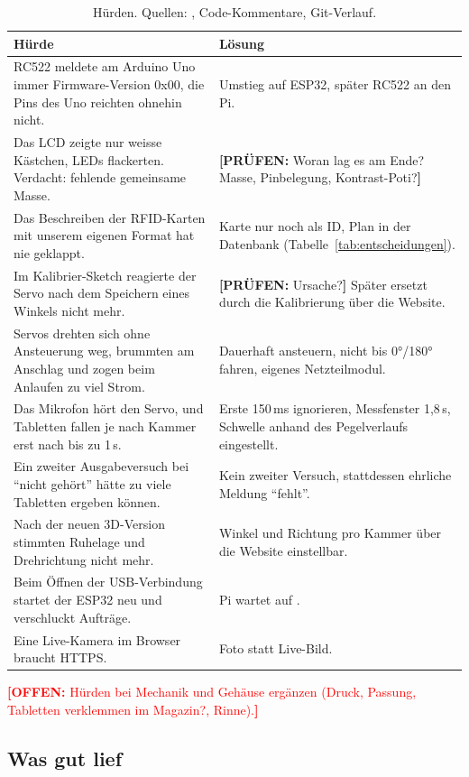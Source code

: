 \documentclass[11pt,a4paper]{article}
\newcommand{\offen}[1]{\textcolor{red}{\textbf{[OFFEN:} #1\textbf{]}}}
\newcommand{\pruefen}[1]{\textcolor{orange!85!black}{\textbf{[PRÜFEN:} #1\textbf{]}}}
\DeclareRobustCommand{\code}[1]{\texttt{\detokenize{#1}}}
\begin{document}
\begin{table}[H]
\centering
\small
\begin{tabularx}{\linewidth}{@{}Y Y@{}}
\toprule
\textbf{Hürde} & \textbf{Lösung} \\
\midrule
RC522 meldete am Arduino Uno immer Firmware-Version 0x00, die Pins des Uno reichten ohnehin nicht. &
  Umstieg auf ESP32, später RC522 an den Pi. \\
Das LCD zeigte nur weisse Kästchen, LEDs flackerten. Verdacht: fehlende gemeinsame Masse. &
  \pruefen{Woran lag es am Ende? Masse, Pinbelegung, Kontrast-Poti?} \\
Das Beschreiben der RFID-Karten mit unserem eigenen Format hat nie geklappt. &
  Karte nur noch als ID, Plan in der Datenbank (Tabelle~\ref{tab:entscheidungen}). \\
Im Kalibrier-Sketch reagierte der Servo nach dem Speichern eines Winkels nicht mehr. &
  \pruefen{Ursache?} Später ersetzt durch die Kalibrierung über die Website. \\
Servos drehten sich ohne Ansteuerung weg, brummten am Anschlag und zogen beim Anlaufen zu viel Strom. &
  Dauerhaft ansteuern, nicht bis 0°/180° fahren, eigenes Netzteilmodul. \\
Das Mikrofon hört den Servo, und Tabletten fallen je nach Kammer erst nach bis zu 1\,s. &
  Erste 150\,ms ignorieren, Messfenster 1,8\,s, Schwelle anhand des Pegelverlaufs eingestellt. \\
Ein zweiter Ausgabeversuch bei \enquote{nicht gehört} hätte zu viele Tabletten ergeben können. &
  Kein zweiter Versuch, stattdessen ehrliche Meldung \enquote{fehlt}. \\
Nach der neuen 3D-Version stimmten Ruhelage und Drehrichtung nicht mehr. &
  Winkel und Richtung pro Kammer über die Website einstellbar. \\
Beim Öffnen der USB-Verbindung startet der ESP32 neu und verschluckt Aufträge. &
  Pi wartet auf \code{BEREIT}. \\
Eine Live-Kamera im Browser braucht HTTPS. & Foto statt Live-Bild. \\
\bottomrule
\end{tabularx}
\caption{Hürden. Quellen: \code{docs/Agent-Kontext.md}, Code-Kommentare, Git-Verlauf.}
\end{table}

\offen{Hürden bei Mechanik und Gehäuse ergänzen (Druck, Passung, Tabletten verklemmen im Magazin?, Rinne).}

\subsection{Was gut lief}
\end{document}
